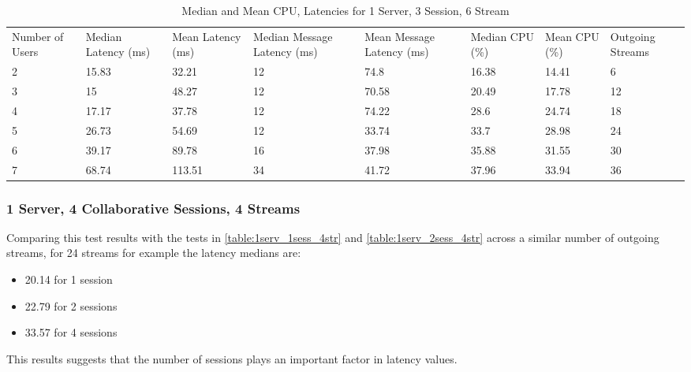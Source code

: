 \begin{table}
\caption{Median and Mean CPU, Latencies for 1 Server, 3 Session, 6 Stream}
\label{table:1serv_3sess_6str}
\begin{tabu} to\linewidth{|X[c]|X[c]|X[c]|X[c]|X[c]|X[c]|X[c]|X[c]|}
\everyrow{\hline}
\hline
Number of Users & Median Latency (ms) & Mean Latency (ms) & Median Message Latency (ms) & Mean Message Latency (ms) & Median CPU (\%) & Mean CPU (\%) & Outgoing Streams\\
2 & 15.83 & 32.21 & 12 & 74.8 & 16.38 & 14.41 & 6 \\
3 & 15 & 48.27 & 12 & 70.58 & 20.49 & 17.78 & 12 \\
4 & 17.17 & 37.78 & 12 & 74.22 & 28.6 & 24.74 & 18 \\
5 & 26.73 & 54.69 & 12 & 33.74 & 33.7 & 28.98 & 24 \\
6 & 39.17 & 89.78 & 16 & 37.98 & 35.88 & 31.55 & 30 \\
7 & 68.74 & 113.51 & 34 & 41.72 & 37.96 & 33.94 & 36 \\
\end{tabu}
\end{table}

\clearpage\subsubsection{1 Server, 4 Collaborative Sessions, 4 Streams}
\label{sec:1serv_4sess_4str}

Comparing this test results with the tests in \ref{table:1serv_1sess_4str} and \ref{table:1serv_2sess_4str} across a similar number of outgoing streams, for 24 streams for example the latency medians are:

\begin{itemize}
	\item 20.14 for 1 session
	\item 22.79 for 2 sessions
	\item 33.57 for 4 sessions
\end{itemize}

This results suggests that the number of sessions plays an important factor in latency values.

